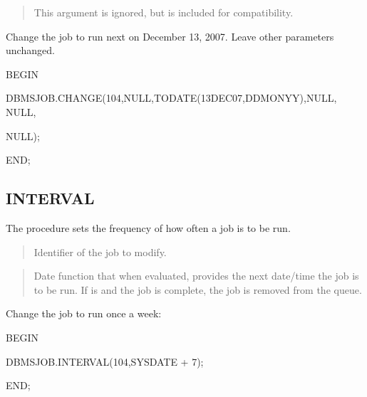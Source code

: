 \documentclass[letterpaper,10pt,english,openany,oneside]{sphinxmanual}
\begin{document}
\begin{quote}

This argument is ignored, but is included for compatibility.
\end{quote}


Change the job to run next on December 13, 2007. Leave other parameters
unchanged.

%
\begin{sphinxVerbatim}[commandchars=\\\{\}]
BEGIN

   DBMS\PYGZus{}JOB.CHANGE(104,NULL,TO\PYGZus{}DATE(\PYGZsq{}13\PYGZhy{}DEC\PYGZhy{}07\PYGZsq{},\PYGZsq{}DD\PYGZhy{}MON\PYGZhy{}YY\PYGZsq{}),NULL, NULL,

   NULL);

END;
\end{sphinxVerbatim}

\newpage


\subsection{INTERVAL}
\label{\detokenize{interval::doc}}\label{\detokenize{interval:interval}}
The  procedure sets the frequency of how often a job is to be
run.



\begin{quote}

Identifier of the job to modify.
\end{quote}

\begin{quote}

Date function that when evaluated, provides the next date/time the job
is to be run. If  is  and the job is complete, the job is
removed from the queue.
\end{quote}


Change the job to run once a week:

%
\begin{sphinxVerbatim}[commandchars=\\\{\}]
BEGIN

   DBMS\PYGZus{}JOB.INTERVAL(104,\PYGZsq{}SYSDATE + 7\PYGZsq{});

END;
\end{sphinxVerbatim}
\end{document}

